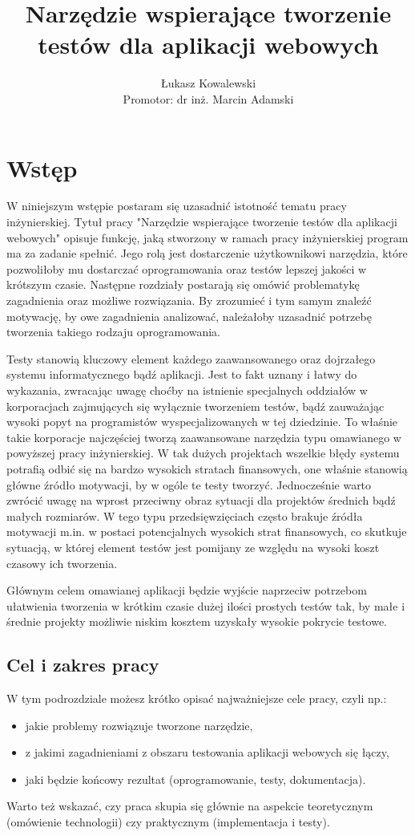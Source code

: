 \documentclass[12pt]{report}
\title{Narzędzie wspierające tworzenie testów dla aplikacji webowych}
\author{
    Łukasz Kowalewski \\ %
    \vspace{0.5cm} %
    Promotor: dr inż. Marcin Adamski %
}
\date{}
\begin{document}
\maketitle

\tableofcontents
\newpage

\chapter{Wstęp}
W niniejszym wstępie postaram się uzasadnić istotność tematu pracy inżynierskiej. Tytuł pracy "Narzędzie wspierające tworzenie testów dla aplikacji webowych" opisuje funkcję, jaką stworzony w ramach pracy inżynierskiej program ma za zadanie spełnić. Jego rolą jest dostarczenie użytkownikowi narzędzia, które pozwoliłoby mu dostarczać oprogramowania oraz testów lepszej jakości w krótszym czasie. Następne rozdziały postarają się omówić problematykę zagadnienia oraz możliwe rozwiązania. By zrozumieć i tym samym znaleźć motywację, by owe zagadnienia analizować, należałoby uzasadnić potrzebę tworzenia takiego rodzaju oprogramowania.

Testy stanowią kluczowy element każdego zaawansowanego oraz dojrzałego systemu informatycznego bądź aplikacji. Jest to fakt uznany i łatwy do wykazania, zwracając uwagę choćby na istnienie specjalnych oddziałów w korporacjach zajmujących się wyłącznie tworzeniem testów, bądź zauważając wysoki popyt na programistów wyspecjalizowanych w tej dziedzinie. To właśnie takie korporacje najczęściej tworzą zaawansowane narzędzia typu omawianego w powyższej pracy inżynierskiej. W tak dużych projektach wszelkie błędy systemu potrafią odbić się na bardzo wysokich stratach finansowych, one właśnie stanowią główne źródło motywacji, by w ogóle te testy tworzyć. Jednocześnie warto zwrócić uwagę na wprost przeciwny obraz sytuacji dla projektów średnich bądź małych rozmiarów. W tego typu przedsięwzięciach często brakuje źródła motywacji m.in. w postaci potencjalnych wysokich strat finansowych, co skutkuje sytuacją, w której element testów jest pomijany ze względu na wysoki koszt czasowy ich tworzenia.

Głównym celem omawianej aplikacji będzie wyjście naprzeciw potrzebom ułatwienia tworzenia w krótkim czasie dużej ilości prostych testów tak, by małe i średnie projekty możliwie niskim kosztem uzyskały wysokie pokrycie testowe.

\section{Cel i zakres pracy}
{W tym podrozdziale możesz krótko opisać najważniejsze cele pracy, czyli np.:
\begin{itemize}
    \item jakie problemy rozwiązuje tworzone narzędzie,
    \item z jakimi zagadnieniami z obszaru testowania aplikacji webowych się łączy,
    \item jaki będzie końcowy rezultat (oprogramowanie, testy, dokumentacja).
\end{itemize}
Warto też wskazać, czy praca skupia się głównie na aspekcie teoretycznym (omówienie technologii) czy praktycznym (implementacja i testy).}
\end{document}
